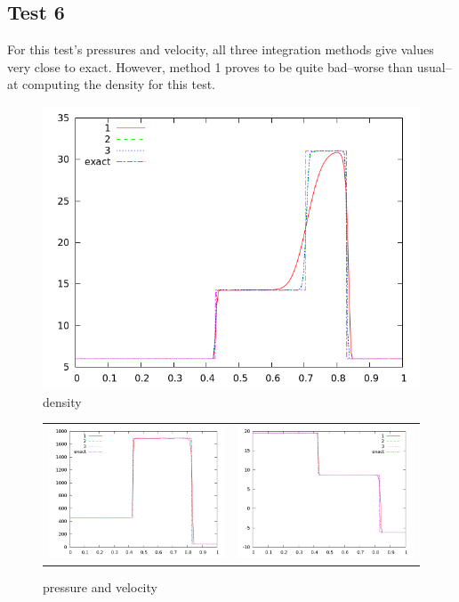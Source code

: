 \documentclass[letterpaper,12pt]{article}
\begin{document}
\subsection{Test 6}
For this test's pressures and velocity, all three integration methods give values very close to exact. However, method 1 proves to be quite bad--worse than usual--at computing the density for this test. 

\begin{figure}[h]
  \begin{center}
     \includegraphics[width=.78\textwidth]{den_T6.png}	
  \end{center}
  \caption{density}
\end{figure}

\begin{figure}
  \begin{center}
	\begin{tabular}{cc}
      \includegraphics[width=.425\textwidth]{prs_T6.png} &
	  \includegraphics[width=.425\textwidth]{vel_T6.png}
	\end{tabular}
  \end{center}
  \caption{pressure and velocity}
\end{figure}
\end{document}

